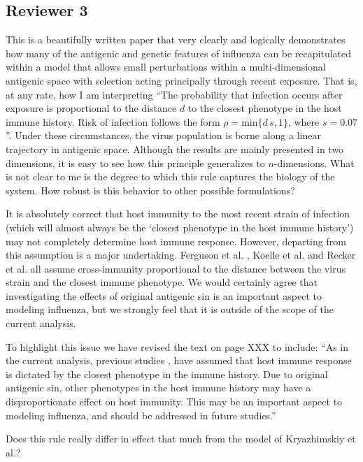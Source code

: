 \documentclass[11pt,oneside,letterpaper]{article}
\def\comment#1{
#1
}
\def\response#1{
\begin{bf}
#1
\end{bf}
}
\def\break{\vspace{0.2cm}}
\begin{document}
\subsection*{Reviewer 3}

\comment{This is a beautifully written paper that very clearly and logically demonstrates how many of the antigenic and genetic features of influenza can be recapitulated within a model that allows small perturbations within a multi-dimensional antigenic space with selection acting principally through recent exposure. That is, at any rate, how I am interpreting ``The probability that infection occurs after exposure is proportional to the distance $d$ to the closest phenotype in the host immune history. Risk of infection follows the form $\rho = \textrm{min}\{d\,s,1\}$, where $s=0.07$''. Under these circumstances, the virus population is borne along a linear trajectory in antigenic space. Although the results are mainly presented in two dimensions, it is easy to see how this principle generalizes to $n$-dimensions. What is not clear to me is the degree to which this rule captures the biology of the system. How robust is this behavior to other possible formulations?}

\response{It is absolutely correct that host immunity to the most recent strain of infection (which will almost always be the `closest phenotype in the host immune history') may not completely determine host immune response.  However, departing from this assumption is a major undertaking.  Ferguson et al. \cite{Ferguson03}, Koelle et al. \cite{Koelle06} and Recker et al. \cite{Recker07} all assume cross-immunity proportional to the distance between the virus strain and the closest immune phenotype.  We would certainly agree that investigating the effects of original antigenic sin is an important aspect to modeling influenza, but we strongly feel that it is outside of the scope of the current analysis.}

\response{To highlight this issue we have revised the text on page XXX to include: ``As in the current analysis, previous studies \cite{Ferguson03,Koelle06,Recker07}, have assumed that host immune response is dictated by the closest phenotype in the immune history.  Due to original antigenic sin, other phenotypes in the host immune history may have a disproportionate effect on host immunity.  This may be an important aspect to modeling influenza, and should be addressed in future studies.''}

\break

\comment{Does this rule really differ in effect that much from the model of Kryazhimskiy et al.?}
\end{document}
